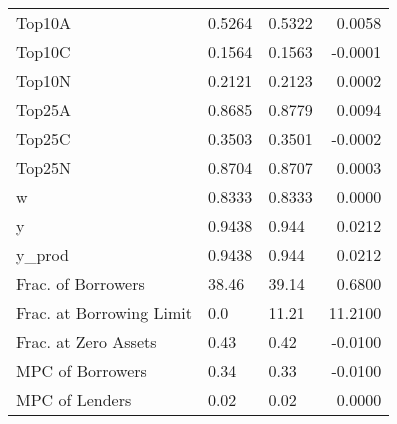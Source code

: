 \begin{table}
\begin{tabular}{lllr}
                  Top10A &  0.5264 &   0.5322 &  0.0058 \\
                  Top10C &  0.1564 &   0.1563 & -0.0001 \\
                  Top10N &  0.2121 &   0.2123 &  0.0002 \\
                  Top25A &  0.8685 &   0.8779 &  0.0094 \\
                  Top25C &  0.3503 &   0.3501 & -0.0002 \\
                  Top25N &  0.8704 &   0.8707 &  0.0003 \\
                       w &  0.8333 &   0.8333 &  0.0000 \\
                       y &  0.9438 &    0.944 &  0.0212 \\
                  y\_prod &  0.9438 &    0.944 &  0.0212 \\
      Frac. of Borrowers &   38.46 &    39.14 &  0.6800 \\
Frac. at Borrowing Limit &     0.0 &    11.21 & 11.2100 \\
    Frac. at Zero Assets &    0.43 &     0.42 & -0.0100 \\
        MPC of Borrowers &    0.34 &     0.33 & -0.0100 \\
          MPC of Lenders &    0.02 &     0.02 &  0.0000 \\
\bottomrule
\end{tabular}
\end{table}
